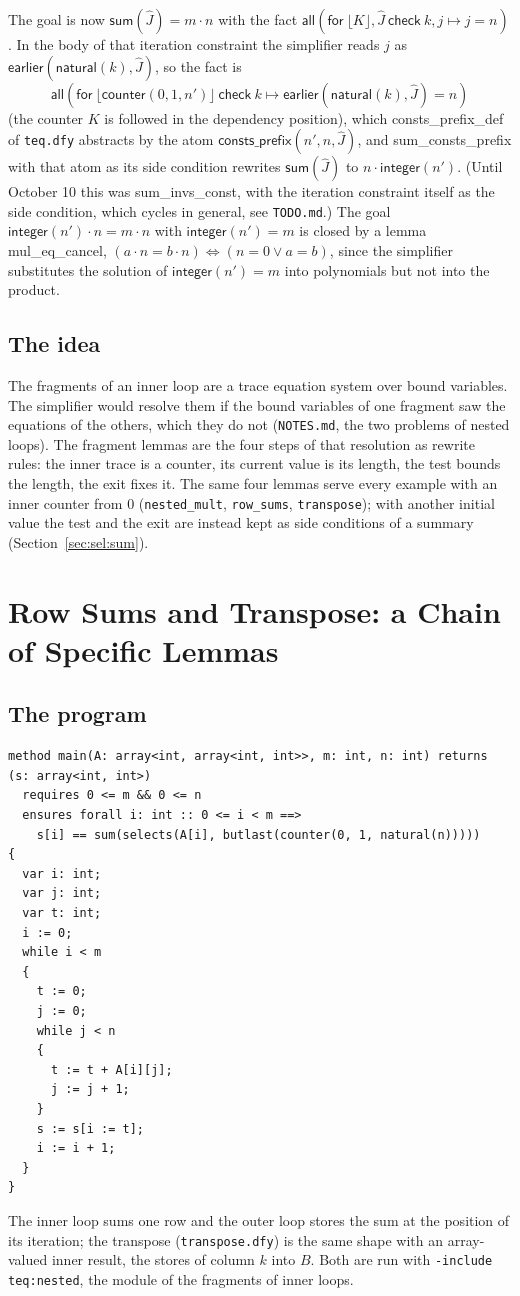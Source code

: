 \documentclass[11pt,a4paper]{article}
\newcommand{\bl}[1]{\lfloor #1\rfloor}                       %
\newcommand{\al}[2]{\mathsf{all}(\mathsf{for}\ #1\ \mathsf{check}\ #2)}
\newcommand{\cnt}{\mathsf{counter}}
\newcommand{\intf}{\mathsf{integer}}
\newcommand{\natf}{\mathsf{natural}}
\newcommand{\lemma}[1]{\textsf{#1}}
\newcommand{\seq}[1]{\hat{#1}}                               %
\begin{document}
The goal is now $\mathsf{sum}(\seq{J}) = m \cdot n$ with the fact
$\al{\bl{K}, \seq{J}}{k, j \mapsto j = n}$. In the body of that iteration constraint the simplifier
reads $j$ as $\mathsf{earlier}(\natf(k), \seq{J})$, so the fact is
\[ \al{\bl{\cnt(0, 1, n')}}{k \mapsto \mathsf{earlier}(\natf(k), \seq{J}) = n} \]
(the counter $K$ is followed in the dependency position), which \lemma{consts\_prefix\_def} of \texttt{teq.dfy} abstracts
by the atom $\mathsf{consts\_prefix}(n', n, \seq{J})$, and \lemma{sum\_consts\_prefix} with that atom as
its side condition rewrites $\mathsf{sum}(\seq{J})$ to $n \cdot \intf(n')$. (Until October 10 this
was \lemma{sum\_invs\_const}, with the iteration constraint itself as the side condition, which cycles
in general, see \texttt{TODO.md}.) The goal $\intf(n') \cdot n = m \cdot n$ with $\intf(n') = m$ is
closed by a lemma \lemma{mul\_eq\_cancel}, $(a \cdot n = b \cdot n) \Leftrightarrow (n = 0 \vee a = b)$,
since the simplifier substitutes the solution of $\intf(n') = m$ into polynomials but not into the
product.

\subsection{The idea}
The fragments of an inner loop are a trace equation system over bound variables. The simplifier would
resolve them if the bound variables of one fragment saw the equations of the others, which they do not
(\texttt{NOTES.md}, the two problems of nested loops). The fragment lemmas are the four steps of that
resolution as rewrite rules: the inner trace is a counter, its current value is its length, the test
bounds the length, the exit fixes it. The same four lemmas serve every example with an inner counter
from $0$ (\texttt{nested\_mult}, \texttt{row\_sums}, \texttt{transpose}); with another initial value
the test and the exit are instead kept as side conditions of a summary (Section~\ref{sec:sel:sum}).

\section{Row Sums and Transpose: a Chain of Specific Lemmas}\label{sec:rows}

\subsection{The program}
\begin{lstlisting}
method main(A: array<int, array<int, int>>, m: int, n: int) returns (s: array<int, int>)
  requires 0 <= m && 0 <= n
  ensures forall i: int :: 0 <= i < m ==>
    s[i] == sum(selects(A[i], butlast(counter(0, 1, natural(n)))))
{
  var i: int;
  var j: int;
  var t: int;
  i := 0;
  while i < m
  {
    t := 0;
    j := 0;
    while j < n
    {
      t := t + A[i][j];
      j := j + 1;
    }
    s := s[i := t];
    i := i + 1;
  }
}
\end{lstlisting}
The inner loop sums one row and the outer loop stores the sum at the position of its iteration; the
transpose (\texttt{transpose.dfy}) is the same shape with an array-valued inner result, the stores of
column $k$ into $B$. Both are run with \texttt{-include teq:nested}, the module of the fragments of inner loops.
\end{document}
